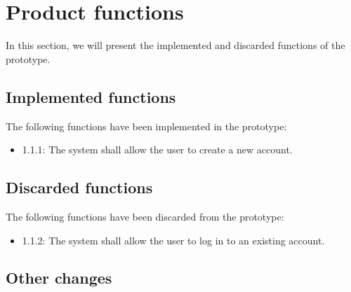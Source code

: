 \section{Product functions}
In this section, we will present the implemented and discarded functions of the prototype.

\subsection{Implemented functions}
The following functions have been implemented in the prototype:
\begin{itemize}
    \item 1.1.1: The system shall allow the user to create a new account.
\end{itemize}

\subsection{Discarded functions}
The following functions have been discarded from the prototype:
\begin{itemize}
    \item 1.1.2: The system shall allow the user to log in to an existing account.
\end{itemize}

\subsection{Other changes}


